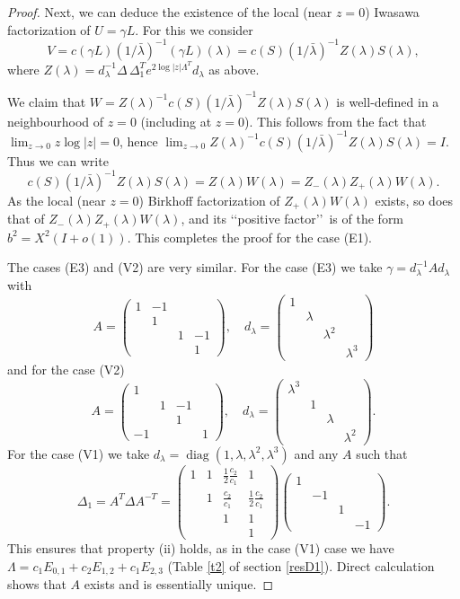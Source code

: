 \documentclass[a4paper,12pt,leqno]{amsart}
\numberwithin{equation}{section}
\theoremstyle{plain}
\theoremstyle{definition}
\newcommand{\la}{\lambda}
\newcommand{\De}{\Delta}
\DeclareMathOperator{\diag}{diag}
\renewcommand{\ll}{\lq\lq}
\newcommand{\rr}{\rq\rq\ }
\newcommand{\bp}{\begin{pmatrix}}
\newcommand{\ep}{\end{pmatrix}}
\newcommand{\bsp}{\left(\begin{smallmatrix}}
\newcommand{\esp}{\end{smallmatrix}\right)}
\newcommand{\MM}{\Lambda}
\newcommand{\gazi}{\gamma}
\begin{document}
{\begin{proof}
Next, we can deduce the existence of the local (near $z=0$) Iwasawa factorization of
$U=\gazi  L$.   For this we consider
\[
V=c( \gazi  L )(1/\bar\la)^{-1}  (\gazi  L)(\la) = 
c(S) (1/\bar\la)^{-1} Z(\la) S(\la), 
\]
where $Z(\la)=d_\la^{-1} \De\,  \De_1^T e^{2\log\vert z\vert \MM^T} d_\la$ as above.

We claim that $W=Z(\la)^{-1} c(S) (1/\bar\la)^{-1} Z(\la) S(\la)$ is well-defined in a neighbourhood of $z=0$ (including at $z=0$).  This follows from the fact that $\lim_{z\to 0} z\log\vert z\vert=0$, hence $\lim_{z\to 0} Z(\la)^{-1} c(S) (1/\bar\la)^{-1} Z(\la)S(\la)=I$. Thus we can write
\[
c(S) (1/\bar\la)^{-1} Z(\la) S(\la) = Z(\la)W(\la)= 
Z_-(\la)Z_+(\la)W(\la).
\]
As the local (near $z=0$) Birkhoff factorization of $Z_+(\la)W(\la)$ exists, so does that of $Z_-(\la)Z_+(\la)W(\la)$, 
 and its \ll positive factor\rr is of the form
$b^2=X^2(I+o(1))$.  
This completes the proof for the case (E1).

The cases (E3) and (V2) are very similar. For the case (E3) we take
$\gazi=d_\la^{-1}Ad_\la$ with
\[
A=
\bsp
1 &-1 & & \\
 & 1 & & \\
 & & 1 &-1 \\
 & & &1
\esp,
\quad
d_\la=
\bsp
1 & & & \\
 & \la & & \\
 & & \la^2 & \\
 & & &\!\!\la^3
\esp
\]
and for the case (V2) 
\[
A=
\bsp
1 & & & \\
 & 1 &-1 & \\
 & & 1 & \\
 -1 & & &1
\esp,
\quad
d_\la=
\bsp
\la^3 & & & \\
 & 1 & & \\
 & & \la & \\
 & & &\la^2
\esp.
\]
For the case (V1) we take $d_\la=\diag(1,\la,\la^2,\la^3)$ and any $A$ such that
\[
\De_1=
A^T \De A^{-T} = 
\bp
1 & 1 & \frac12\frac{c_2}{c_1} & 1\\
 & 1 & \frac{c_2}{c_1} & \frac12\frac{c_2}{c_1}\\
  & & 1 & 1\\
  & & & 1
\ep
\bp
1 & & & \\
 & -1 & & \\
  & & 1 & \\
   & & & -1
\ep.
\]
This ensures that property (ii) holds, as in the case (V1) case we have
$\MM=  c_1E_{0,1}  +  c_2E_{1,2}  +  c_1E_{2,3}$
(Table \ref{t2} of section \ref{resD1}).
Direct calculation shows that $A$ exists and is essentially unique.
\end{proof}

}
\end{document}
